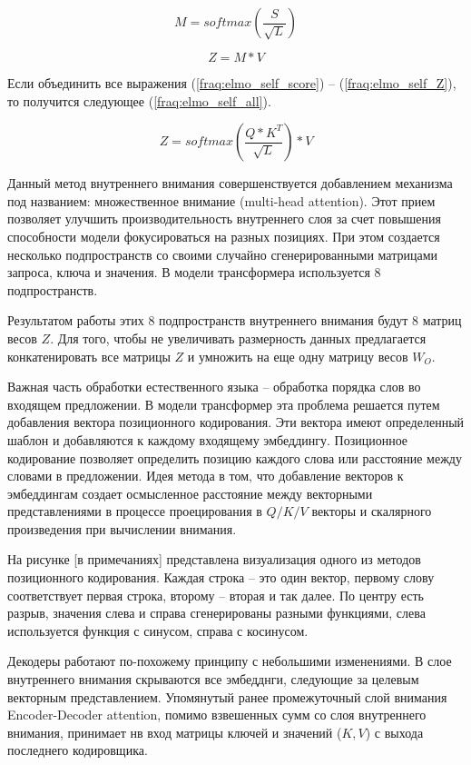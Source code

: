 \documentclass[a4paper,14pt]{article}
\begin{document}
\begin{equation}
	M = softmax(\dfrac{S}{\sqrt{L}})
	\label{fraq:elmo_self_softmax}
\end{equation}

\begin{equation}
	Z =  M * V
	\label{fraq:elmo_self_Z}
\end{equation}

Если объединить все выражения (\ref{fraq:elmo_self_score}) -- (\ref{fraq:elmo_self_Z}), то получится следующее (\ref{fraq:elmo_self_all}).

\begin{equation}
	Z =  softmax(\dfrac{Q * K^T}{\sqrt{L}}) * V
	\label{fraq:elmo_self_all}
\end{equation}

Данный метод внутреннего внимания совершенствуется добавлением механизма под названием: множественное внимание (multi-head attention).
Этот прием позволяет улучшить производительность внутреннего слоя за счет повышения способности модели фокусироваться на разных позициях.
При этом создается несколько подпространств со своими случайно сгенерированными матрицами запроса, ключа и значения.
В модели трансформера используется 8 подпространств.

Результатом работы этих 8 подпространств внутреннего внимания будут 8 матриц весов $Z$.
Для того, чтобы не увеличивать размерность данных предлагается конкатенировать все матрицы $Z$ и умножить на еще одну матрицу весов $W_O$.

Важная часть обработки естественного языка -- обработка порядка слов во входящем предложении.
В модели трансформер эта проблема решается путем добавления вектора позиционного кодирования.
Эти вектора имеют определенный шаблон и добавляются к каждому входящему эмбеддингу.
Позиционное кодирование позволяет определить позицию каждого слова или расстояние между словами в предложении.
Идея метода в том, что добавление векторов к эмбеддингам создает осмысленное расстояние между векторными представлениями в процессе проецирования в $Q/K/V$ векторы и скалярного произведения при вычислении внимания.

На рисунке [в примечаниях] представлена визуализация одного из методов позиционного кодирования.
Каждая строка -- это один вектор, первому слову соответствует первая строка, второму -- вторая и так далее.
По центру есть разрыв, значения слева и справа сгенерированы разными функциями, слева используется функция с синусом, справа с косинусом.

Декодеры работают по-похожему принципу с небольшими изменениями.
В слое внутреннего внимания скрываются все эмбедднги, следующие за целевым векторным представлением.
Упомянутый ранее промежуточный слой внимания Encoder-Decoder attention, помимо взвешенных сумм со слоя внутреннего внимания, принимает нв вход матрицы ключей и значений ($K,V$) с выхода последнего кодировщика.
\end{document}
